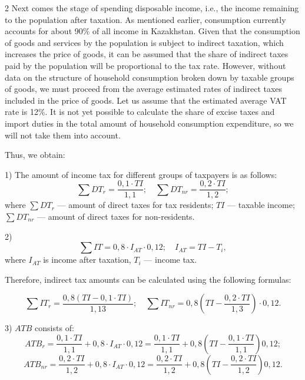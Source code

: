 \begin{multicols}{2}
Next comes the stage of spending disposable income, i.e., the income
remaining to the population after taxation. As mentioned earlier,
consumption currently accounts for about 90\% of all income in
Kazakhstan. Given that the consumption of goods and services by the
population is subject to indirect taxation, which increases the price of
goods, it can be assumed that the share of indirect taxes paid by the
population will be proportional to the tax rate. However, without data
on the structure of household consumption broken down by taxable groups
of goods, we must proceed from the average estimated rates of indirect
taxes included in the price of goods. Let us assume that the estimated
average VAT rate is 12\%. It is not yet possible to calculate the share
of excise taxes and import duties in the total amount of household
consumption expenditure, so we will not take them into account.

Thus, we obtain:

1) The amount of income tax for different groups of taxpayers is as follows:
\begin{equation*}
\sum DT_{r} = \frac{0,1 \cdot TI}{1,1}; \quad \sum DT_{nr} = \frac{0,2 \cdot TI}{1,2};
\end{equation*}
where $\sum DT_{r}$ — amount of direct taxes for tax residents; $TI$ — taxable income; $\sum DT_{nr}$ — amount of direct taxes for non-residents.

2) 
\begin{equation*}
\sum IT = 0,8 \cdot I_{AT} \cdot 0,12; \quad I_{AT} = TI - T_{i},
\end{equation*}
where $I_{AT}$ is income after taxation, $T_{i}$ — income tax.

Therefore, indirect tax amounts can be calculated using the following formulas:
\end{multicols}
\vspace{-1em}
\begin{equation*}
\sum IT_{r} = \frac{0,8(TI - 0,1 \cdot TI)}{1,13}; \quad \sum IT_{nr} = 0,8\left(TI - \frac{0,2 \cdot TI}{1,3}\right) \cdot 0,12.
\end{equation*}

3) $ATB$ consists of:
\begin{equation*}
ATB_{r} = \frac{0,1 \cdot TI}{1,1} + 0,8 \cdot I_{AT} \cdot 0,12 = \frac{0,1 \cdot TI}{1,1} + 0,8\left(TI - \frac{0,1 \cdot TI}{1,1}\right)0,12;
\end{equation*}
\begin{equation*}
ATB_{nr} = \frac{0,2 \cdot TI}{1,2} + 0,8 \cdot I_{AT} \cdot 0,12 = \frac{0,2 \cdot TI}{1,2} + 0,8\left(TI - \frac{0,2 \cdot TI}{1,2}\right)0,12.
\end{equation*}

